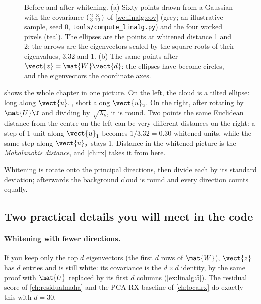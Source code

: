\begin{figure}[htbp]
\caption{Before and after whitening. (a) Sixty points drawn from a Gaussian with the covariance
$\begin{psmallmatrix} 2 & 3\\ 3 & 10\end{psmallmatrix}$ of \cref{we:linalg:cov} (grey;
an illustrative sample, seed 0, \texttt{tools/compute\_linalg.py}) and the four worked pixels
(teal). The ellipses are the points at whitened distance 1 and 2; the arrows are the eigenvectors
scaled by the square roots of their eigenvalues, 3.32 and 1. (b) The same points after
$\vect{z} = \mat{W}\vect{d}$: the ellipses have become circles, and the eigenvectors the
coordinate axes.}
\label{fig:linalg:whitening}
\end{figure}

 shows the whole chapter in one picture. On the left, the cloud is a
tilted ellipse: long along $\vect{u}_1$, short along $\vect{u}_2$. On the right, after rotating
by $\mat{U}\T$ and dividing by $\sqrt{\lambda_k}$, it is round. Two points the same Euclidean
distance from the centre on the left can be very different distances on the right: a step of 1
unit along $\vect{u}_1$ becomes $1/3.32 = 0.30$ whitened units, while the same step along
$\vect{u}_2$ stays 1. Distance in the whitened picture is the \emph{Mahalanobis distance}, and
\cref{ch:rx} takes it from here.

\begin{keypoint}
Whitening is rotate onto the principal directions, then divide each by its standard deviation;
afterwards the background cloud is round and every direction counts equally.
\end{keypoint}

\subsection{Two practical details you will meet in the code}

\paragraph{Whitening with fewer directions.} If you keep only the top $d$ eigenvectors (the
first $d$ rows of $\mat{W}$), $\vect{z}$ has $d$ entries and is still white: its covariance is
the $d\times d$ identity, by the same proof with $\mat{U}$ replaced by its first $d$ columns
(\cref{ex:linalg:5}). The residual score of \cref{ch:residualmaha} and the PCA-RX baseline of
\cref{ch:localrx} do exactly this with $d = 30$.

